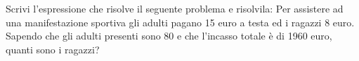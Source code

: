 \item Scrivi l'espressione che risolve il seguente problema e risolvila: Per assistere ad una manifestazione sportiva gli adulti pagano 15 euro a testa ed i ragazzi 8 euro. Sapendo che gli adulti presenti sono 80 e che l'incasso totale è di 1960 euro, quanti sono i ragazzi?
